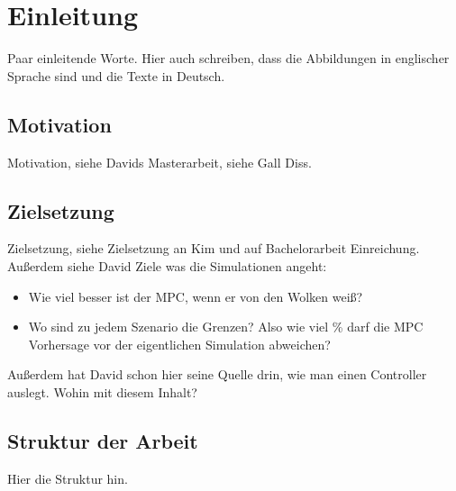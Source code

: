 \chapter{Einleitung} \label{ch_Einleitung}
Paar einleitende Worte.
Hier auch schreiben, dass die Abbildungen in englischer Sprache sind und die Texte in Deutsch.


\section{Motivation} \label{sec_Motivation}
Motivation, siehe Davids Masterarbeit, siehe Gall Diss.

\section{Zielsetzung} \label{sec_Zielsetzung}
Zielsetzung, siehe Zielsetzung an Kim und auf Bachelorarbeit Einreichung.
Außerdem siehe David Ziele was die Simulationen angeht:
\begin{itemize}
    \item Wie viel besser ist der MPC, wenn er von den Wolken weiß?
    \item Wo sind zu jedem Szenario die Grenzen? Also wie viel \% darf die MPC Vorhersage vor der eigentlichen Simulation abweichen?
\end{itemize}
Außerdem hat David schon hier seine Quelle drin, wie man einen Controller auslegt. \cite[S. 23-25]{Reuter.2008} \cite{Beispiel.2023}
Wohin mit diesem Inhalt?

\section{Struktur der Arbeit} \label{sec_Struktur}
Hier die Struktur hin.

